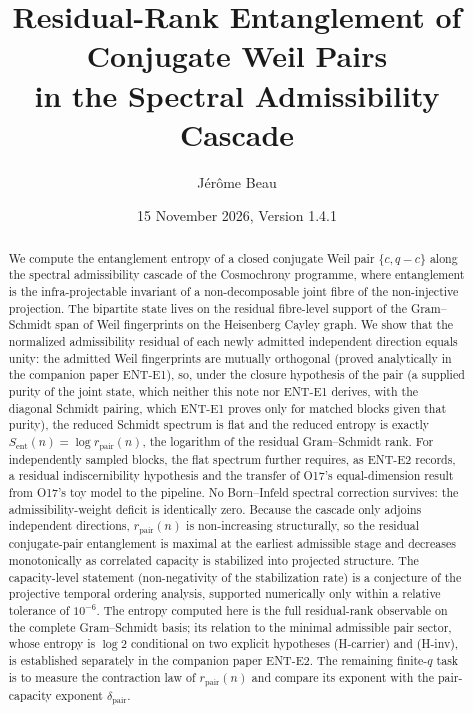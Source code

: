 \documentclass[11pt]{article}
\title{Residual-Rank Entanglement of Conjugate Weil Pairs\\
in the Spectral Admissibility Cascade}
\author{J\'er\^ome Beau}
\date{15 November 2026, Version 1.4.1}
\newcommand{\Sent}{S_{\mathrm{ent}}}
\newcommand{\rpair}{r_{\mathrm{pair}}}
\begin{document}
  \maketitle

  \begin{abstract}
    We compute the entanglement entropy of a closed conjugate Weil pair $\{c,q-c\}$ along the spectral
    admissibility cascade of the Cosmochrony programme, where entanglement is the infra-projectable
    invariant of a non-decomposable joint fibre of the non-injective projection.
    The bipartite state lives on the residual fibre-level support of the Gram--Schmidt span of Weil
    fingerprints on the Heisenberg Cayley graph.
    We show that the normalized admissibility residual of each newly admitted independent direction equals
    unity: the admitted Weil fingerprints are mutually orthogonal (proved analytically in the companion
    paper ENT-E1), so, under the closure hypothesis of the pair (a supplied purity of the joint state, which
    neither this note nor ENT-E1 derives, with the diagonal Schmidt pairing, which ENT-E1 proves only for
    matched blocks given that purity), the reduced Schmidt spectrum is flat and the reduced entropy is exactly
    $\Sent(n)=\log \rpair(n)$, the logarithm of the residual Gram--Schmidt rank.
    For independently sampled blocks, the flat spectrum further requires, as ENT-E2 records, a residual
    indiscernibility hypothesis and the transfer of O17's equal-dimension result from O17's toy model to the
    pipeline.
    No Born--Infeld spectral correction survives: the admissibility-weight deficit is identically zero.
    Because the cascade only adjoins independent directions, $\rpair(n)$ is non-increasing structurally,
    so the residual conjugate-pair entanglement is maximal at the earliest admissible stage and decreases
    monotonically as correlated capacity is stabilized into projected structure.
    The capacity-level statement (non-negativity of the stabilization rate) is a conjecture of the projective
    temporal ordering analysis, supported numerically only within a relative tolerance of $10^{-6}$.
    The entropy computed here is the full residual-rank observable on the complete Gram--Schmidt basis;
    its relation to the minimal admissible pair sector, whose entropy is $\log 2$ conditional on two
    explicit hypotheses (H-carrier) and (H-inv), is established separately in the companion paper ENT-E2.
    The remaining finite-$q$ task is to measure the contraction law of $\rpair(n)$ and compare its exponent
    with the pair-capacity exponent $\delta_{\mathrm{pair}}$.
  \end{abstract}
\end{document}
